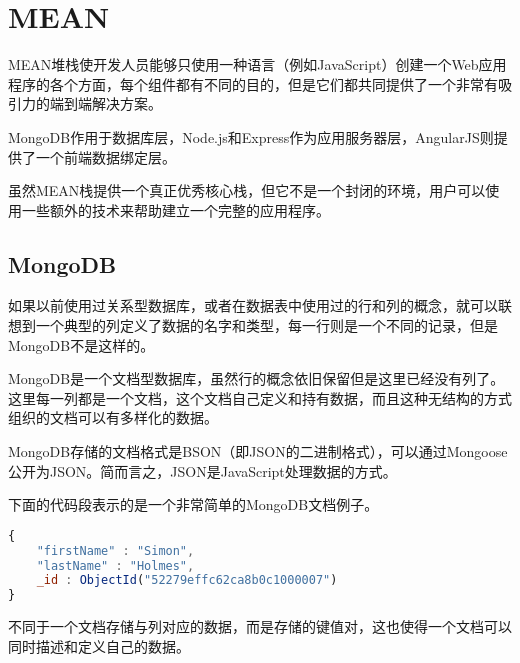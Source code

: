 \begin{lstlisting}[language=bash]

\end{lstlisting}



\begin{lstlisting}[language=bash]

\end{lstlisting}






\chapter{MEAN}



MEAN堆栈使开发人员能够只使用一种语言（例如JavaScript）创建一个Web应用程序的各个方面，每个组件都有不同的目的，但是它们都共同提供了一个非常有吸引力的端到端解决方案。

MongoDB作用于数据库层，Node.js和Express作为应用服务器层，AngularJS则提供了一个前端数据绑定层。

虽然MEAN栈提供一个真正优秀核心栈，但它不是一个封闭的环境，用户可以使用一些额外的技术来帮助建立一个完整的应用程序。


\section{MongoDB}

如果以前使用过关系型数据库，或者在数据表中使用过的行和列的概念，就可以联想到一个典型的列定义了数据的名字和类型，每一行则是一个不同的记录，但是MongoDB不是这样的。

MongoDB是一个文档型数据库，虽然行的概念依旧保留但是这里已经没有列了。这里每一列都是一个文档，这个文档自己定义和持有数据，而且这种无结构的方式组织的文档可以有多样化的数据。

MongoDB存储的文档格式是BSON（即JSON的二进制格式），可以通过Mongoose公开为JSON。简而言之，JSON是JavaScript处理数据的方式。

下面的代码段表示的是一个非常简单的MongoDB文档例子。

\begin{lstlisting}[language=JavaScript]
{
    "firstName" : "Simon",    
    "lastName" : "Holmes", 
    _id : ObjectId("52279effc62ca8b0c1000007")    
}
\end{lstlisting}

不同于一个文档存储与列对应的数据，而是存储的键值对，这也使得一个文档可以同时描述和定义自己的数据。

